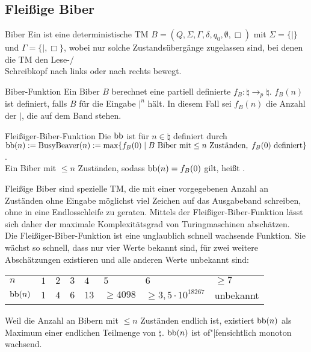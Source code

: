 \pagebreak

\subsection{%
    Fleißige Biber%
}

\begin{Def}{Biber}
    Ein  ist eine deterministische TM
    $B = (Q, \Sigma, \Gamma, \delta, q_0, \emptyset, \Box)$ mit
    $\Sigma = \{|\}$ und $\Gamma = \{|, \Box\}$, wobei nur solche Zustandsübergänge zugelassen
    sind, bei denen die TM den Lese-/\\Schreibkopf nach links oder nach rechts bewegt.
\end{Def}

\begin{Def}{Biber-Funktion}
    Ein Biber $B$ berechnet eine partiell definierte 
    $f_B\colon \natural \rightarrow_p \natural$.
    $f_B(n)$ ist definiert, falls $B$ für die Eingabe $|^n$ hält.
    In diesem Fall sei $f_B(n)$ die Anzahl der $|$, die auf dem Band stehen.
\end{Def}

\begin{Def}{Fleißiger-Biber-Funktion}
    Die  $\text{bb}$ ist für $n \in \natural$ definiert durch
    $\text{bb}(n) := \text{BusyBeaver}(n) :=
    \max\{f_B(0) \;|\; B \text{ Biber mit} \le n \text{ Zuständen},\;
    f_B(0) \text{ definiert}\}$.\\
    Ein Biber mit $\le n$ Zuständen, sodass $\text{bb}(n) = f_B(0)$ gilt, heißt
    .
\end{Def}

\begin{Bem}
    Fleißige Biber sind spezielle TM, die mit einer vorgegebenen Anzahl an Zuständen ohne
    Eingabe möglichst viel Zeichen auf das Ausgabeband schreiben, ohne in eine Endlosschleife
    zu geraten.
    Mittels der Fleißiger-Biber-Funktion lässt sich daher der maximale Komplexitätsgrad von
    Turingmaschinen abschätzen.\\
    Die Fleißiger-Biber-Funktion ist eine unglaublich schnell wachsende Funktion.
    Sie wächst so schnell, dass nur vier Werte bekannt sind, für zwei weitere Abschätzungen
    existieren und alle anderen Werte unbekannt sind:
    
    \begin{tabular}{p{15mm}p{5mm}p{5mm}p{5mm}p{5mm}p{15mm}p{25mm}p{20mm}}
        \toprule
        \textbf{$n$} &
        $1$ & $2$ & $3$ & $4$ & $5$ & $6$ & $\ge 7$\\
        
        \textbf{$\text{bb}(n)$} &
        $1$ & $4$ & $6$ & $13$ & $\ge 4098$ & $\ge 3{,}5 \cdot 10^{18267}$ & unbekannt\\
        \bottomrule
    \end{tabular}
    
    Weil die Anzahl an Bibern mit $\le n$ Zuständen endlich ist, existiert $\text{bb}(n)$ als
    Maximum einer endlichen Teilmenge von $\natural$.
    $\text{bb}(n)$ ist of"|fensichtlich monoton wachsend.
\end{Bem}

